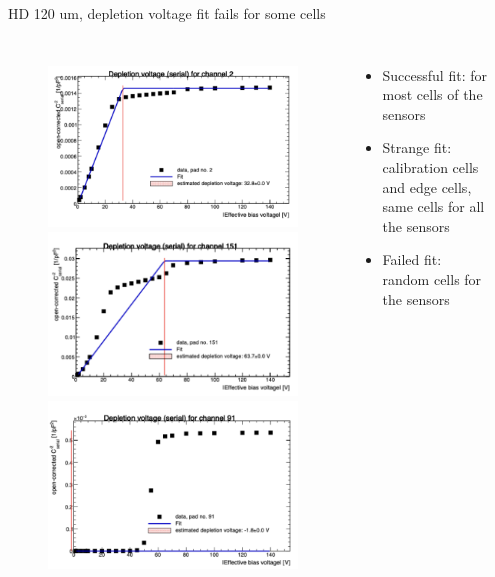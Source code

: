 \documentclass{beamer}
\begin{document}
\begin{frame}{HD 120 um, depletion voltage fit fails for some cells}
  \begin{columns}
    \begin{figure}
      \includegraphics[width=.55\textwidth]{plots/CV_Fit_just_figures1.png}
      \includegraphics[width=.55\textwidth]{plots/CV_Fit_just_figures2.png}
      \includegraphics[width=.55\textwidth]{plots/CV_Fit_just_figures3.png}
    \end{figure}

    \begin{itemize}
      \item Successful fit: for most cells of the sensors
      \item Strange fit: calibration cells and edge cells, same cells for all the sensors
      \item Failed fit: random cells for the sensors
    \end{itemize}
    \href{https://indico.cern.ch/event/1119831/contributions/4702464/attachments/2378225/4063679/Si\%20sensor\%20meeting.pdf}{}


\end{columns}

\end{frame}
\end{document}
